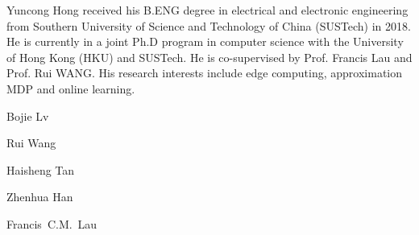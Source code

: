 
\begin{IEEEbiography}{Yuncong Hong}
    received his B.ENG degree in electrical and electronic engineering from Southern University of Science and Technology of China (SUSTech) in 2018. He is currently in a joint Ph.D program in computer science with the University of Hong Kong (HKU) and SUSTech. He is co-supervised by Prof. Francis Lau and Prof. Rui WANG. His research interests include edge computing, approximation MDP and online learning.
\end{IEEEbiography}

\begin{IEEEbiography}{Bojie Lv}
    \blindtext
\end{IEEEbiography}

\begin{IEEEbiography}{Rui Wang}
    \blindtext
\end{IEEEbiography}

\begin{IEEEbiography}{Haisheng Tan}
    \blindtext
\end{IEEEbiography}

\begin{IEEEbiography}{Zhenhua Han}
    \blindtext
\end{IEEEbiography}

\begin{IEEEbiography}{Francis~C.M.~Lau}
    \blindtext
\end{IEEEbiography}

